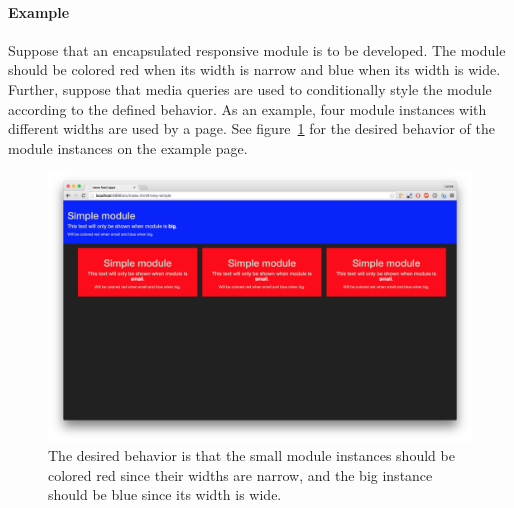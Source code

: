 \documentclass[a4paper,11pt]{kth-mag}
\begin{document}
        \paragraph{Example}
        Suppose that an encapsulated responsive module is to be developed.
        The module should be colored red when its width is narrow and blue when its width is wide.
        Further, suppose that media queries are used to conditionally style the module according to the defined behavior.
        As an example, four module instances with different widths are used by a page.
        See figure~\ref{fig:problem-eq} for the desired behavior of the module instances on the example page.
        \begin{figure}[ht]
          \centering
          \begin{minipage}{.5\textwidth}
            \centering
            \includegraphics[width=\linewidth]{images/eq-big}
          \end{minipage}%
          \caption{The desired behavior is that the small module instances should be colored red since their widths are narrow, and the big instance should be blue since its width is wide.}
          \label{fig:problem-eq}
        \end{figure}
\end{document}
